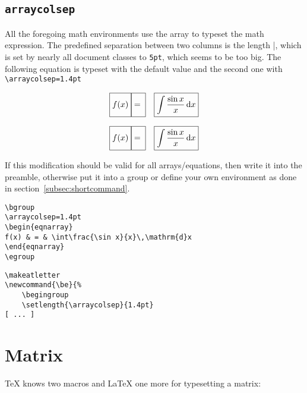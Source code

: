 \subsection{\texttt{arraycolsep}}\label{sec:arraycolsep}
%
All the foregoing math environments use the array to typeset the math
expression. The predefined separation between two columns is the length
|, which is set by nearly all document classes to \verb|5pt|,
which seems to be too big. The following equation is typeset with the
default value and the second one with \verb|\arraycolsep=1.4pt|


\bgroup
\fboxsep=0pt
\def\xstrut{\vphantom{\int\frac{\sin x}{x}}}
\begin{eqnarray*}
\boxed{f(x)\xstrut} & \boxed{=\xstrut} & \boxed{\int\frac{\sin x}{x}\,\mathrm{d}x}
\end{eqnarray*}

\vspace{-2ex}
\arraycolsep=1.4pt
\begin{eqnarray*}
\boxed{f(x)\xstrut} & \boxed{=\xstrut} & \boxed{\int\frac{\sin x}{x}\,\mathrm{d}x}
\end{eqnarray*}
\egroup

If this modification should be valid for all arrays/equations, then write it into the
preamble, otherwise put it into a group or define your own environment as done
in section~\vref{subsec:shortcommand}.

\begin{lstlisting}
\bgroup
\arraycolsep=1.4pt
\begin{eqnarray}
f(x) & = & \int\frac{\sin x}{x}\,\mathrm{d}x
\end{eqnarray}
\egroup
\end{lstlisting}

\begin{lstlisting}
\makeatletter
\newcommand{\be}{%
    \begingroup
    \setlength{\arraycolsep}{1.4pt}
[ ... ]
\end{lstlisting}

\section{Matrix}\label{sec:matrix}
%
\TeX{} knows two macros and \LaTeX{} one more for typesetting a 
matrix:

